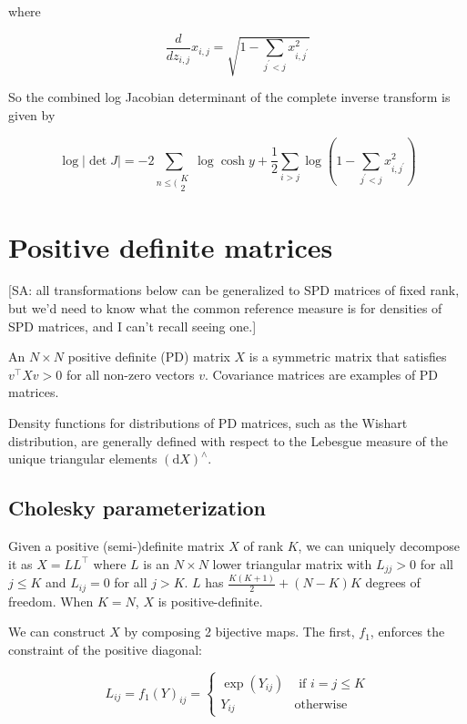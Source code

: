 \documentclass[11pt]{article}
\newcommand{\dv}[1]{\mathrm{d}{#1}}
\begin{document}
where

\[
\frac{d}{d z_{i, j}} x_{i, j}=\sqrt{1-\sum_{j^{\prime}<j} x_{i, j^{\prime}}^{2}}
\]

So the combined log Jacobian determinant
of the complete inverse transform is given by

\[
\log |\operatorname{det} J|=-2 \sum_{n \leq(\substack{K \\ 2}} \log \cosh y+\frac{1}{2} \sum_{i>j} \log \left(1-\sum_{j^{\prime}<j} x_{i, j^{\prime}}^{2}\right)
\]




\section{Positive definite matrices}

[SA: all transformations below can be generalized to SPD matrices of fixed rank, but we'd need to know what the common reference measure is for densities of SPD matrices, and I can't recall seeing one.]

An $N \times N$ positive definite (PD) matrix $X$ is a symmetric matrix that satisfies $v^\top X v > 0$ for all non-zero vectors $v$.
Covariance matrices are examples of PD matrices.

Density functions for distributions of PD matrices, such as the Wishart distribution, are generally defined with respect to the Lebesgue measure of the unique triangular elements $(\dv{X})^\wedge$.

\subsection{Cholesky parameterization}\label{cholesky}

Given a positive (semi-)definite matrix $X$ of rank $K$, we can uniquely decompose it as $X = L L^\top$ where $L$ is an $N \times N$ lower triangular matrix with $L_{jj} > 0$ for all $j \le K$ and $L_{ij} = 0$ for all $j > K$.
$L$ has $\frac{K(K+1)}{2} + (N - K)K$ degrees of freedom.
When $K=N$, $X$ is positive-definite.

We can construct $X$ by composing 2 bijective maps.
The first, $f_1$, enforces the constraint of the positive diagonal:

\[L_{ij} = f_1(Y)_{ij} = \begin{cases} \exp(Y_{ij}) & \text{ if } i = j \le K \\ Y_{ij} & \text{otherwise} \end{cases}\]
\end{document}
